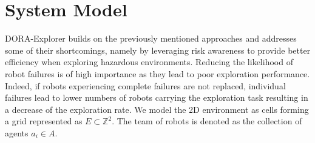 \section{System Model}
DORA-Explorer builds on the previously mentioned approaches and addresses some of their shortcomings, namely by leveraging risk awareness to provide better efficiency when exploring hazardous environments. Reducing the
likelihood of robot failures is of high importance as they lead to poor exploration performance. Indeed, if robots experiencing complete
failures are not replaced, individual failures lead to lower numbers
of robots carrying the exploration task resulting in a decrease of the exploration rate. We model the 2D environment as cells forming a grid
represented as $E \subset \mathbb{Z}^2$. The team of robots is denoted
as the collection of agents $a_i \in A$.

    
    


